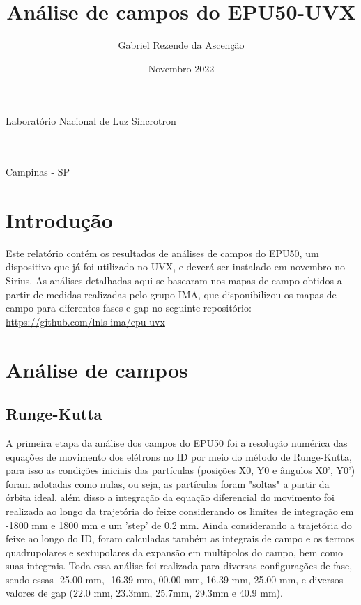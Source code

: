 \documentclass[a4paper,12pt]{article}
\title{Análise de campos do EPU50-UVX}
\author{Gabriel Rezende da Ascenção}
\date{Novembro 2022}
\begin{document}
\makeatletter
\begin{titlepage}
\begin{center}
    {\large Laboratório Nacional de Luz Síncrotron}\\
    \vspace{7cm}
    {\Large\uppercase{\@author}\\
    \vspace{2cm}
    {\uppercase{\textbf{\@title}}}}\\
\end{center}
\vspace{2cm}
\begin{flushright}

\end{flushright}
\vspace{4cm}
\begin{center}
    {\large
    Campinas - SP\\
   \@date}
\end{center}
\end{titlepage}
\makeatother

\newpage
\tableofcontents 
\newpage
\section{Introdução} 
    Este relatório contém os resultados de análises de campos do EPU50, um dispositivo que já foi utilizado no UVX, e deverá ser instalado em novembro no Sirius.
    As análises detalhadas aqui se basearam nos mapas de campo obtidos a partir de medidas realizadas pelo grupo IMA, que disponibilizou os mapas de campo para diferentes fases e gap no seguinte repositório:
    \url{https://github.com/lnls-ima/epu-uvx}
    



\section{Análise de campos}
\subsection{Runge-Kutta}
A primeira etapa da análise dos campos do EPU50 foi a resolução numérica das equações de movimento dos elétrons no ID por meio do método de Runge-Kutta, para isso as condições iniciais das partículas (posições X0, Y0 e ângulos X0', Y0') foram adotadas como nulas, ou seja, as partículas foram "soltas" a partir da órbita ideal, além disso a integração da equação diferencial do movimento foi realizada ao longo da trajetória do feixe considerando os limites de integração em -1800 mm e 1800 mm e um 'step' de 0.2 mm. Ainda considerando a trajetória do feixe ao longo do ID, foram calculadas também as integrais de campo e os termos quadrupolares e sextupolares da expansão em multipolos do campo, bem como suas integrais. Toda essa análise foi realizada para diversas configurações de fase, sendo essas -25.00 mm, -16.39 mm, 00.00 mm, 16.39 mm, 25.00 mm, e diversos valores de gap (22.0 mm, 23.3mm, 25.7mm, 29.3mm e 40.9 mm).
\end{document}
